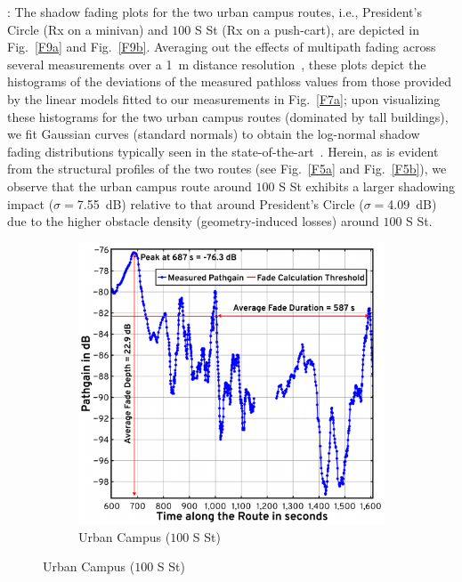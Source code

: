 \documentclass[12pt, draftcls, onecolumn]{IEEEtran}
\begin{document}
{: The shadow fading plots for the two urban campus routes, i.e., President's Circle (Rx on a minivan) and $100$ S St (Rx on a push-cart), are depicted in Fig.~\ref{F9a} and Fig.~\ref{F9b}. Averaging out the effects of multipath fading across several measurements over a \SI{1}{\meter} distance resolution~\cite{Averaging_Threshold}, these plots depict the histograms of the deviations of the measured pathloss values from those provided by the linear models fitted to our measurements in Fig.~\ref{F7a}; upon visualizing these histograms for the two urban campus routes (dominated by tall buildings), we fit Gaussian curves (standard normals) to obtain the log-normal shadow fading distributions typically seen in the state-of-the-art~\cite{DopplerHST}. Herein, as is evident from the structural profiles of the two routes (see Fig.~\ref{F5a} and Fig.~\ref{F5b}), we observe that the urban campus route around $100$ S St exhibits a larger shadowing impact ($\sigma{=}$\SI{7.55}{\deci\bel}) relative to that around President's Circle ($\sigma{=}$\SI{4.09}{\deci\bel}) due to the higher obstacle density (geometry-induced losses) around $100$ S St.
\begin{figure} [t]
    \centering
    \begin{subfigure}{0.5\linewidth}
        \centering
        \includegraphics[width=1.0\linewidth]{figs/urban_campus_pathgain_vs_time_gap_annotated.pdf}
        \caption{Urban Campus ($100$ S St)}

\end{subfigure}
\end{figure}}
\end{document}

